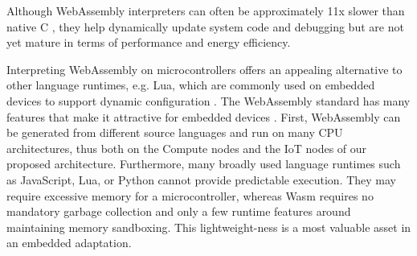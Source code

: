 Although WebAssembly interpreters can often be approximately 11x slower than native C \cite{wasm3-performance}, they help dynamically update system code and debugging but are not yet mature in terms of performance and energy efficiency.

Interpreting WebAssembly on microcontrollers offers an appealing alternative to other language runtimes, e.g. Lua, which are commonly used on embedded devices to support dynamic configuration \cite{brzoza2016embedded}. The WebAssembly standard has many features that make it attractive for embedded devices \cite{peach2020ewasm}. First, WebAssembly can be generated from different source languages and run on many CPU architectures, thus both on the Compute nodes and the IoT nodes of our proposed architecture. Furthermore, many broadly used language runtimes such as JavaScript, Lua, or Python cannot provide predictable execution. They may require excessive memory for a microcontroller, whereas Wasm requires no mandatory garbage collection and only a few runtime features around maintaining memory sandboxing. This lightweight-ness is a most valuable asset in an embedded adaptation. \\




